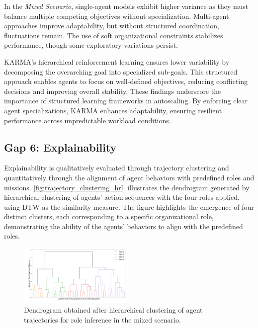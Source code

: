 In the \textit{Mixed Scenario}, single-agent models exhibit higher variance as they must balance multiple competing objectives without specialization. Multi-agent approaches improve adaptability, but without structured coordination, fluctuations remain. The use of soft organizational constraints stabilizes performance, though some exploratory variations persist.

KARMA's hierarchical reinforcement learning ensures lower variability by decomposing the overarching goal into specialized sub-goals. This structured approach enables agents to focus on well-defined objectives, reducing conflicting decisions and improving overall stability.
%
These findings underscore the importance of structured learning frameworks in autoscaling. By enforcing clear agent specializations, KARMA enhances adaptability, ensuring resilient performance across unpredictable workload conditions.


\subsection{Gap 6: Explainability}
\label{subsec:gap_explainability}

Explainability is qualitatively evaluated through trajectory clustering and quantitatively through the alignment of agent behaviors with predefined roles and missions.
\noindent \autoref{fig:trajectory_clustering_hrl} illustrates the dendrogram generated by hierarchical clustering of agents' action sequences with the four roles applied, using DTW as the similarity measure. The figure highlights the emergence of four distinct clusters, each corresponding to a specific organizational role, demonstrating the ability of the agents' behaviors to align with the predefined roles.

\begin{figure}[h!]
  \centering
  \includegraphics[width=0.49\textwidth]{figures/role_hierarchical_clustering.pdf}
  \caption{Dendrogram obtained after hierarchical clustering of agent trajectories for role inference in the mixed scenario.}
  \label{fig:trajectory_clustering_hrl}
\end{figure}

